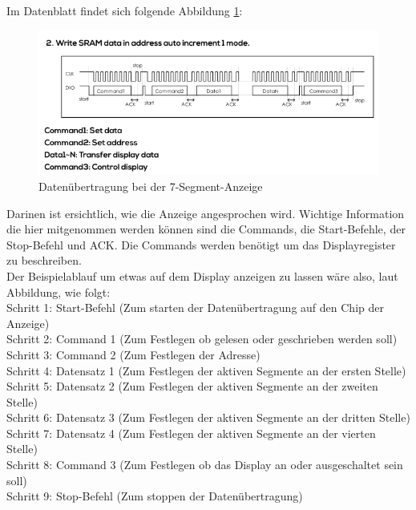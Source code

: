 \documentclass[11pt,a4paper,titlepage]{article}
\begin{document}
Im Datenblatt findet sich folgende Abbildung \cref{data-transfer}:

\vspace{1cm}
\begin{figure}[h]
    \begin{center}
        \includegraphics[width=\textwidth]{Bilder/Data-transfer.png}
        \caption{Datenübertragung bei der 7-Segment-Anzeige}
        \label{data-transfer}
    \end{center}
\end{figure}

Darinen ist ersichtlich, wie die Anzeige angesprochen wird.
Wichtige Information die hier mitgenommen werden können sind die Commands, die Start-Befehle, der Stop-Befehl und ACK.
Die Commands werden benötigt um das Displayregister zu beschreiben.\\

\newpage
Der Beispielablauf um etwas auf dem Display anzeigen zu lassen wäre also, laut Abbildung, wie folgt:\\
Schritt 1: Start-Befehl (Zum starten der Datenübertragung auf den Chip der Anzeige)\\
Schritt 2: Command 1 (Zum Festlegen ob gelesen oder geschrieben werden soll)\\
Schritt 3: Command 2 (Zum Festlegen der Adresse)\\
Schritt 4: Datensatz 1 (Zum Festlegen der aktiven Segmente an der ersten Stelle)\\
Schritt 5: Datensatz 2 (Zum Festlegen der aktiven Segmente an der zweiten Stelle)\\
Schritt 6: Datensatz 3 (Zum Festlegen der aktiven Segmente an der dritten Stelle)\\
Schritt 7: Datensatz 4 (Zum Festlegen der aktiven Segmente an der vierten Stelle)\\
Schritt 8: Command 3 (Zum Festlegen ob das Display an oder ausgeschaltet sein soll)\\
Schritt 9: Stop-Befehl (Zum stoppen der Datenübertragung)\\
\end{document}
